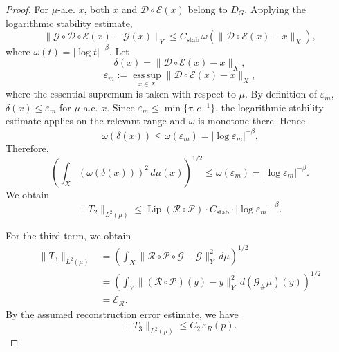 \documentclass{article}
\numberwithin{equation}{section}
\theoremstyle{plain}
\newcommand{\Lip}{\operatorname{Lip}}
\begin{document}
\begin{proof}
		For $\mu$-a.e. $x$, both $x$ and $\mathcal D\circ\mathcal E(x)$ belong to $D_G$. Applying the logarithmic stability estimate,
		\begin{equation*}
			\|\mathscr{G}\circ\mathcal{D}\circ\mathcal{E}(x)-\mathscr{G}(x)\|_Y
			\leq
			C_{\mathrm{stab}}\,\omega(\|\mathcal{D}\circ\mathcal{E}(x)-x\|_X),
		\end{equation*}
		where $\omega(t)=|\log t|^{-\beta}$.
		Let
		\begin{equation*}
			\delta(x)=\|\mathcal{D}\circ\mathcal{E}(x)-x\|_X,
		\end{equation*} 
		\begin{equation*}
			\varepsilon_m:=\operatorname*{ess\,sup}_{x\in X}\|\mathcal{D}\circ\mathcal{E}(x)-x\|_X,
		\end{equation*}
		where the essential supremum is taken with respect to $\mu$.
		By definition of $\varepsilon_m$, $\delta(x)\le \varepsilon_m$ for $\mu$-a.e. $x$. Since $\varepsilon_m\le \min\{\tau,e^{-1}\}$, the logarithmic stability estimate applies on the relevant range and $\omega$ is monotone there. Hence
		\begin{equation*}
			\omega(\delta(x))
			\leq
			\omega(\varepsilon_m)
			=
			|\log \varepsilon_m|^{-\beta}.
		\end{equation*}
		Therefore,
		\begin{equation*}
			\left(
			\int_X (\omega(\delta(x)))^2\,d\mu(x)
			\right)^{1/2}
			\leq
			\omega(\varepsilon_m)
			=
			|\log \varepsilon_m|^{-\beta}.
		\end{equation*}
		We obtain
		\begin{equation*}
			\|T_2\|_{L^2(\mu)}
			\leq
			\Lip(\mathcal{R}\circ\mathcal{P})\cdot C_{\mathrm{stab}}\cdot |\log \varepsilon_m|^{-\beta}.
		\end{equation*}
		
		For the third term, we obtain
		\begin{equation*}
			\begin{aligned}
				\|T_3\|_{L^2(\mu)}
				&=
				\left(
				\int_X
				\|
				\mathcal{R}\circ\mathcal{P}\circ \mathscr{G}
				-
				\mathscr{G}
				\|_{Y}^{2}
				\,d\mu
				\right)^{1/2}\\
				&=
				\left(
				\int_Y
				\|(\mathcal R\circ\mathcal P)(y)-y\|_Y^2
				\,d(\mathscr G_\#\mu)(y)
				\right)^{1/2}\\
				&=
				\mathscr E_{\mathcal R}.
			\end{aligned}
		\end{equation*}
		By the assumed reconstruction error estimate, we have
		\begin{equation*}
			\|T_3\|_{L^2(\mu)}
			\leq
			C_2\,\varepsilon_R(p).
		\end{equation*}
		

\end{proof}
\end{document}
